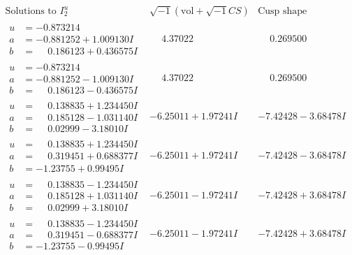 \documentclass[1p]{elsarticle_modified}
\theoremstyle{definition}
\newcommand{\I}{\sqrt{-1}}
\begin{document}
$$\begin{array}{c|c|c}  
\text{Solutions to }I^u_{2}& \I (\text{vol} + \sqrt{-1}CS) & \text{Cusp shape}\\
 \hline 
\begin{aligned}
u &= -0.873214\phantom{ +0.000000I} \\
a &= -0.881252 + 1.009130 I \\
b &= \phantom{-}0.186123 + 0.436575 I\end{aligned}
 & \phantom{-}4.37022\phantom{ +0.000000I} & \phantom{-}0.269500\phantom{ +0.000000I} \\ \hline\begin{aligned}
u &= -0.873214\phantom{ +0.000000I} \\
a &= -0.881252 - 1.009130 I \\
b &= \phantom{-}0.186123 - 0.436575 I\end{aligned}
 & \phantom{-}4.37022\phantom{ +0.000000I} & \phantom{-}0.269500\phantom{ +0.000000I} \\ \hline\begin{aligned}
u &= \phantom{-}0.138835 + 1.234450 I \\
a &= \phantom{-}0.185128 - 1.031140 I \\
b &= \phantom{-}0.02999 - 3.18010 I\end{aligned}
 & -6.25011 + 1.97241 I & -7.42428 - 3.68478 I \\ \hline\begin{aligned}
u &= \phantom{-}0.138835 + 1.234450 I \\
a &= \phantom{-}0.319451 + 0.688377 I \\
b &= -1.23755 + 0.99495 I\end{aligned}
 & -6.25011 + 1.97241 I & -7.42428 - 3.68478 I \\ \hline\begin{aligned}
u &= \phantom{-}0.138835 - 1.234450 I \\
a &= \phantom{-}0.185128 + 1.031140 I \\
b &= \phantom{-}0.02999 + 3.18010 I\end{aligned}
 & -6.25011 - 1.97241 I & -7.42428 + 3.68478 I \\ \hline\begin{aligned}
u &= \phantom{-}0.138835 - 1.234450 I \\
a &= \phantom{-}0.319451 - 0.688377 I \\
b &= -1.23755 - 0.99495 I\end{aligned}
 & -6.25011 - 1.97241 I & -7.42428 + 3.68478 I \\ \hline\begin{aligned}

\end{aligned}
\end{array}$$
\end{document}
